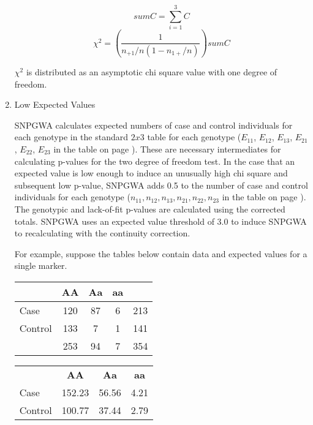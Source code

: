 \begin{enumerate}
  \begin{equation*}
    sumC = \sum_{i=1}^3C
  \end{equation*}
  \begin{equation*}
    \chi^2 = \left(\frac{1}{n_{+1}/n(1-n_{1+}/n)}\right)sumC
  \end{equation*}

$\chi^2$ is distributed as an asymptotic chi square value with one degree of freedom.

\vspace{1em}

\item{Low Expected Values}

  SNPGWA calculates expected numbers of case and control individuals for each
  genotype in the standard $2x3$ table for each genotype
  ($E_{11}$, $E_{12}$, $E_{13}$, $E_{21}$, $E_{22}$, $E_{23}$ in the table on page
  \pageref{tab:e_tab}).  These are necessary intermediates for calculating
  p-values for the two degree of freedom test.  In the case that an expected
  value is low enough to induce an unusually high chi square and subsequent low
  p-value, SNPGWA adds 0.5 to the number of case and control individuals for
  each genotype ($n_{11}, n_{12}, n_{13}, n_{21}, n_{22}, n_{23}$ in the table
  on page \pageref{tab:n_tab}).  The genotypic and lack-of-fit p-values are
  calculated using the corrected totals.  SNPGWA uses an expected value
  threshold of 3.0 to induce SNPGWA to recalculating with the continuity
  correction.

  For example, suppose the tables below contain data and expected values for a
  single marker.
  \begin{center}
    \begin{tabular}{lcccc}
      \hline
      {}     & \textbf{AA} & \textbf{Aa} & \textbf{aa} & {}\\
      \hline
      Case    & 120 & 87 & 6 & 213 \\
      Control & 133 &  7 & 1 & 141 \\
      {}    & 253 & 94 & 7 & 354 \\
      \hline
    \end{tabular}
  \end{center}

  \begin{center}
    \begin{tabular}{lccc}
      \hline
      {}     & \textbf{AA} & \textbf{Aa} & \textbf{aa} \\
      Case    & 152.23      & 56.56       & 4.21 \\
      Control & 100.77      & 37.44       & 2.79 \\
      \hline
    \end{tabular}
  \end{center}


\end{enumerate}
